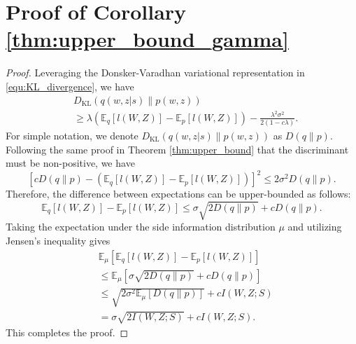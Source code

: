 \documentclass[lettersize,journal]{IEEEtran}
\newcommand{\E}{\mathbb{E}}
\theoremstyle{definition}
\theoremstyle{plain}
\begin{document}
\appendices

\section{Proof of Corollary \ref{thm:upper_bound_gamma}}
\label{apx:proof_gamma}
\begin{proof}
\label{thm:proof_gamma}
    Leveraging the Donsker-Varadhan variational representation in \cref{equ:KL_divergence}, we have
    \begin{equation}
        \label{equ:KL_divergence_gap_gamma}
        \begin{split}
            & D_{\text{KL}}(q(w, z | s)\| p(w,z)) \\ 
            & \geq \lambda\left(\E_{q}\left[ l(W,Z)\right] - \E_{p}\left[ l(W,Z)\right]\right) - \frac{\lambda^2\sigma^2}{2(1-c\lambda)}. 
        \end{split}
    \end{equation}
    For simple notation, we denote $D_{\text{KL}}(q(w, z | s)\| p(w,z))$ as $D(q\|p)$. Following the same proof in Theorem \ref{thm:upper_bound} that the discriminant must be non-positive, we have
    \begin{equation}
        \left[cD(q\|p) - \left(\E_{q}\left[ l(W,Z)\right] - \E_{p}\left[ l(W,Z)\right]\right)\right]^2 \leq 2\sigma^2 D(q\|p).
    \end{equation}
    Therefore, the difference between expectations can be upper-bounded as follows:
    \begin{equation}
        \E_{q}\left[ l(W,Z)\right] - \E_{p}\left[ l(W,Z)\right] \leq \sigma\sqrt{2D(q\|p)} + cD(q\|p).
    \end{equation}
    Taking the expectation under the side information distribution $\mu$ and utilizing Jensen's inequality gives
    \begin{equation}
        \label{equ:jensen_inequality_gamma}
        \begin{split}
            & \E_{\mu}\left[\E_q[l(W,Z)]-\E_p[l(W,Z)]\right] \\
            & \leq \E_{\mu}\left[\sigma\sqrt{2D(q\|p)} + cD(q\|p)\right] \\
            & \leq \sqrt{2 \sigma^2 \E_{\mu}\left[D(q\|p)\right]} + cI(W,Z;S)\\
            & = \sigma\sqrt{2I(W,Z;S)} + cI(W,Z;S).
        \end{split}
    \end{equation}
    This completes the proof. 
    
\end{proof}
\end{document}
